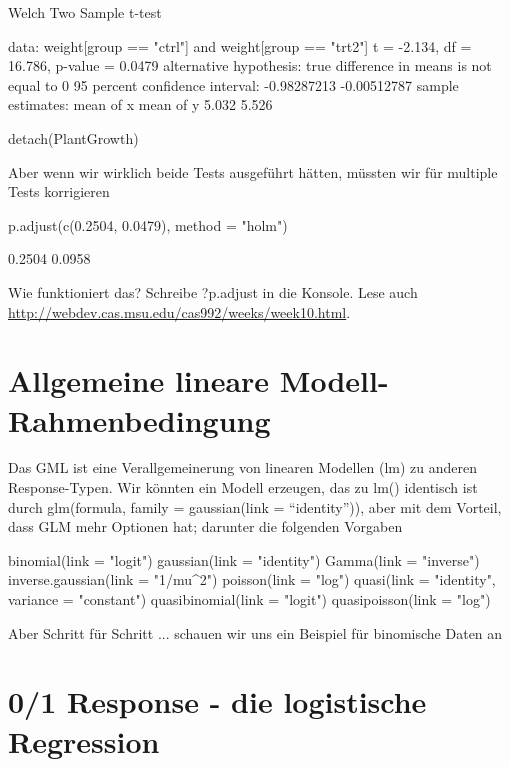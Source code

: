 \documentclass[a4paper,twoside]{tufte-book}\usepackage[]{graphicx}\usepackage[]{color}
\begin{document}
\begin{appendices}
\begin{Schunk}
\begin{Soutput}
	Welch Two Sample t-test

data:  weight[group == "ctrl"] and weight[group == "trt2"]
t = -2.134, df = 16.786, p-value = 0.0479
alternative hypothesis: true difference in means is not equal to 0
95 percent confidence interval:
 -0.98287213 -0.00512787
sample estimates:
mean of x mean of y 
    5.032     5.526 
\end{Soutput}
\begin{Sinput}
detach(PlantGrowth)
\end{Sinput}
\end{Schunk}

Aber wenn wir wirklich beide Tests ausgeführt hätten, müssten wir für multiple Tests korrigieren

\begin{Schunk}
\begin{Sinput}
p.adjust(c(0.2504, 0.0479), method = "holm")
\end{Sinput}
\begin{Soutput}
[1] 0.2504 0.0958
\end{Soutput}
\end{Schunk}

Wie funktioniert das? Schreibe ?p.adjust in die Konsole. Lese auch \href{das hier}{http://webdev.cas.msu.edu/cas992/weeks/week10.html}.

\section{Allgemeine lineare Modell-Rahmenbedingung}

Das GML ist eine Verallgemeinerung von linearen Modellen (lm) zu anderen Response-Typen. Wir könnten ein Modell erzeugen, das zu lm() identisch ist durch glm(formula, family = gaussian(link = "`identity"')), aber mit dem Vorteil, dass GLM mehr Optionen hat; darunter die folgenden Vorgaben

\begin{Schunk}
\begin{Sinput}
binomial(link = "logit")
gaussian(link = "identity")
Gamma(link = "inverse")
inverse.gaussian(link = "1/mu^2")
poisson(link = "log")
quasi(link = "identity", variance = "constant")
quasibinomial(link = "logit")
quasipoisson(link = "log")
\end{Sinput}
\end{Schunk}


Aber Schritt für Schritt ... schauen wir uns ein Beispiel für binomische Daten an


\section{0/1 Response - die logistische Regression}


\end{appendices}
\end{document}
